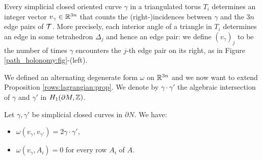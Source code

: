 Every simplicial closed oriented curve $\gamma$ in a triangulated torus $T_i$ determines an integer vector $v_\gamma \in \mathbb{R}^{3n}$ that counts the (right-)incidences between $\gamma$ and the $3n$ edge pairs of $\mathcal{T}$. More precisely, each interior angle of a triangle in $T_i$ determines an edge in some tetrahedron $\Delta_j$ and hence an edge pair: we define $(v_\gamma)_j$ to be the number of times $\gamma$ encounters the $j$-th edge pair on its right, as in Figure \ref{path_holonomy:fig}-(left).

We defined an alternating degenerate form $\omega$ on $\mathbb{R}^{3n}$ and we now want to extend Proposition \ref{rows:lagrangian:prop}. We denote by $\gamma \cdot \gamma'$ the algebraic intersection of $\gamma$ and $\gamma'$ in $H_1(\partial M, \mathbb{Z})$.

\begin{prop} \label{A:gamma:gamma':prop}
Let $\gamma, \gamma'$ be simplicial closed curves in $\partial N$. We have:
\begin{itemize}
\item $\omega(v_\gamma, v_{\gamma'}) = 2 \gamma \cdot \gamma'$,
\item $\omega(v_\gamma, A_i) = 0 $ for every row $A_i$ of $A$.
\end{itemize}
\end{prop}
